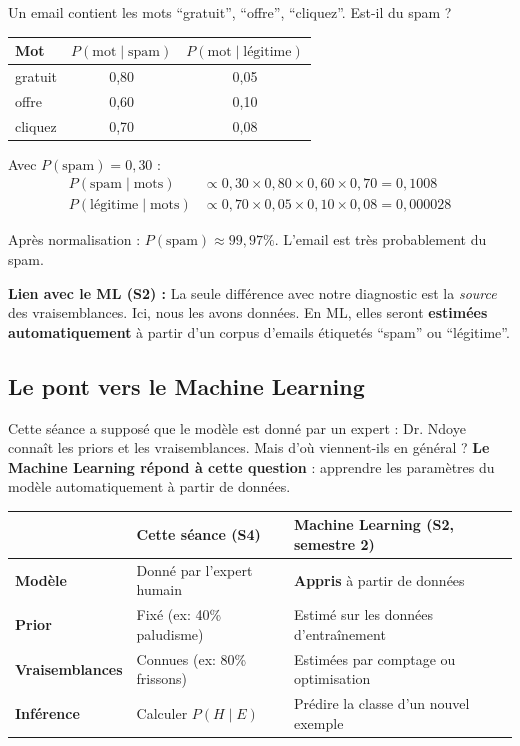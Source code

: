 \documentclass[11pt,a4paper]{article}
\begin{document}
\begin{exemplebox}
Un email contient les mots ``gratuit'', ``offre'', ``cliquez''. Est-il du spam ?

\begin{center}
\begin{tabular}{lcc}
\toprule
\textbf{Mot} & $P(\text{mot} \mid \text{spam})$ & $P(\text{mot} \mid \text{légitime})$ \\
\midrule
gratuit & 0,80 & 0,05 \\
offre & 0,60 & 0,10 \\
cliquez & 0,70 & 0,08 \\
\bottomrule
\end{tabular}
\end{center}

Avec $P(\text{spam}) = 0{,}30$ :
\begin{align*}
P(\text{spam} \mid \text{mots}) &\propto 0{,}30 \times 0{,}80 \times 0{,}60 \times 0{,}70 = 0{,}1008 \\
P(\text{légitime} \mid \text{mots}) &\propto 0{,}70 \times 0{,}05 \times 0{,}10 \times 0{,}08 = 0{,}000028
\end{align*}

Après normalisation : $P(\text{spam}) \approx 99{,}97\%$. L'email est très probablement du spam.

\textbf{Lien avec le ML (S2) :} La seule différence avec notre diagnostic est la \textit{source} des vraisemblances. Ici, nous les avons données. En ML, elles seront \textbf{estimées automatiquement} à partir d'un corpus d'emails étiquetés ``spam'' ou ``légitime''.
\end{exemplebox}

\subsection{Le pont vers le Machine Learning}

Cette séance a supposé que le modèle est donné par un expert : Dr. Ndoye connaît les priors et les vraisemblances. Mais d'où viennent-ils en général ? \textbf{Le Machine Learning répond à cette question} : apprendre les paramètres du modèle automatiquement à partir de données.

\begin{center}
\begin{tabular}{lp{5cm}p{5cm}}
\toprule
& \textbf{Cette séance (S4)} & \textbf{Machine Learning (S2, semestre 2)} \\
\midrule
\textbf{Modèle} & Donné par l'expert humain & \textbf{Appris} à partir de données \\
\textbf{Prior} & Fixé (ex: 40\% paludisme) & Estimé sur les données d'entraînement \\
\textbf{Vraisemblances} & Connues (ex: 80\% frissons) & Estimées par comptage ou optimisation \\
\textbf{Inférence} & Calculer $P(H \mid E)$ & Prédire la classe d'un nouvel exemple \\
\bottomrule
\end{tabular}
\end{center}
\end{document}
